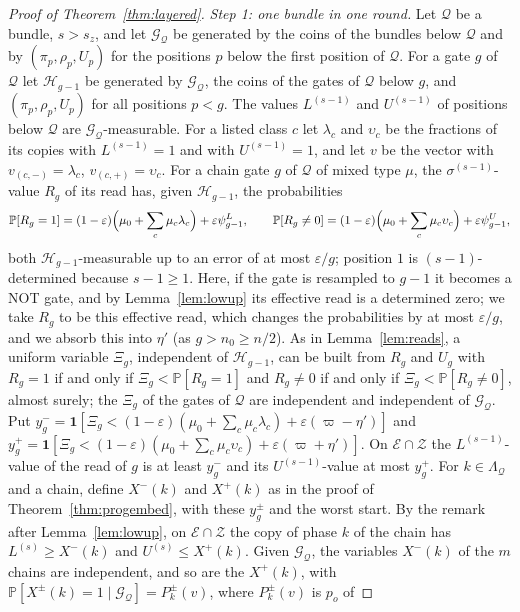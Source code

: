 \documentclass[11pt]{amsart}
\theoremstyle{definition}
\theoremstyle{remark}
\newcommand{\eps}{\varepsilon}
\newcommand{\PP}{\mathbb{P}}
\begin{document}
\begin{proof}[Proof of Theorem~\ref{thm:layered}]
\emph{Step 1: one bundle in one round.} Let $\mathcal Q$ be a bundle, $s>s_z$, and let
$\mathcal G_{\mathcal Q}$ be generated by the coins of the bundles below $\mathcal Q$ and by
$(\pi_p,\rho_p,U_p)$ for the positions $p$ below the first position of $\mathcal Q$. For a gate $g$ of
$\mathcal Q$ let $\mathcal H_{g-1}$ be generated by $\mathcal G_{\mathcal Q}$, the coins of the gates of
$\mathcal Q$ below $g$, and $(\pi_p,\rho_p,U_p)$ for all positions $p<g$. The values $L^{(s-1)}$ and $U^{(s-1)}$ of positions below
$\mathcal Q$ are $\mathcal G_{\mathcal Q}$-measurable. For a listed class $c$ let $\lambda_c$ and
$\upsilon_c$ be the fractions of its copies with $L^{(s-1)}=1$ and with $U^{(s-1)}=1$, and let
$v$ be the vector with $v_{(c,-)}=\lambda_c$, $v_{(c,+)}=\upsilon_c$. For a chain gate $g$ of
$\mathcal Q$ of mixed type $\mu$, the $\sigma^{(s-1)}$-value $R_g$ of its read has, given
$\mathcal H_{g-1}$, the probabilities
\[
\PP[R_g=1]=(1-\eps)\Bigl(\mu_0+\sum_c\mu_c\lambda_c\Bigr)+\eps\psi^L_{g-1},\qquad
\PP[R_g\ne0]=(1-\eps)\Bigl(\mu_0+\sum_c\mu_c\upsilon_c\Bigr)+\eps\psi^U_{g-1},
\]
both $\mathcal H_{g-1}$-measurable up to an error of at most $\eps/g$; position $1$ is
$(s-1)$-determined because $s-1\ge1$. Here, if the gate is resampled to $g-1$ it becomes a NOT
gate, and by Lemma~\ref{lem:lowup} its effective read is a determined zero; we take $R_g$ to be this
effective read, which changes the probabilities by at most $\eps/g$, and we absorb this into
$\eta'$ (as $g>n_0\ge n/2$). As in
Lemma~\ref{lem:reads}, a uniform variable $\Xi_g$, independent of $\mathcal H_{g-1}$, can be built from
$R_g$ and $U_g$ with $R_g=1$ if and only if $\Xi_g<\PP[R_g=1]$ and $R_g\ne0$ if and only if
$\Xi_g<\PP[R_g\ne0]$, almost surely; the $\Xi_g$ of the gates of $\mathcal Q$ are independent and
independent of $\mathcal G_{\mathcal Q}$. Put $y^-_g=\mathbf 1[\Xi_g<(1-\eps)(\mu_0+\sum_c\mu_c\lambda_c)+\eps(\varpi-\eta')]$
and $y^+_g=\mathbf 1[\Xi_g<(1-\eps)(\mu_0+\sum_c\mu_c\upsilon_c)+\eps(\varpi+\eta')]$. On
$\mathcal E\cap\mathcal Z$ the $L^{(s-1)}$-value of the read of $g$ is at least $y^-_g$ and its
$U^{(s-1)}$-value at most $y^+_g$. For $k\in\Lambda_{\mathcal Q}$ and a chain, define
$X^-(k)$ and $X^+(k)$ as in the proof of Theorem~\ref{thm:progembed}, with these $y^\pm_g$ and the
worst start. By the remark after Lemma~\ref{lem:lowup}, on $\mathcal E\cap\mathcal Z$ the copy of
phase $k$ of the chain has $L^{(s)}\ge X^-(k)$ and $U^{(s)}\le X^+(k)$. Given $\mathcal G_{\mathcal Q}$,
the variables $X^-(k)$ of the $m$ chains are independent, and so are the $X^+(k)$, with
$\PP[X^\pm(k)=1\mid\mathcal G_{\mathcal Q}]=P^\pm_k(v)$, where $P^\pm_k(v)$ is $p_o$ of

\end{proof}
\end{document}
